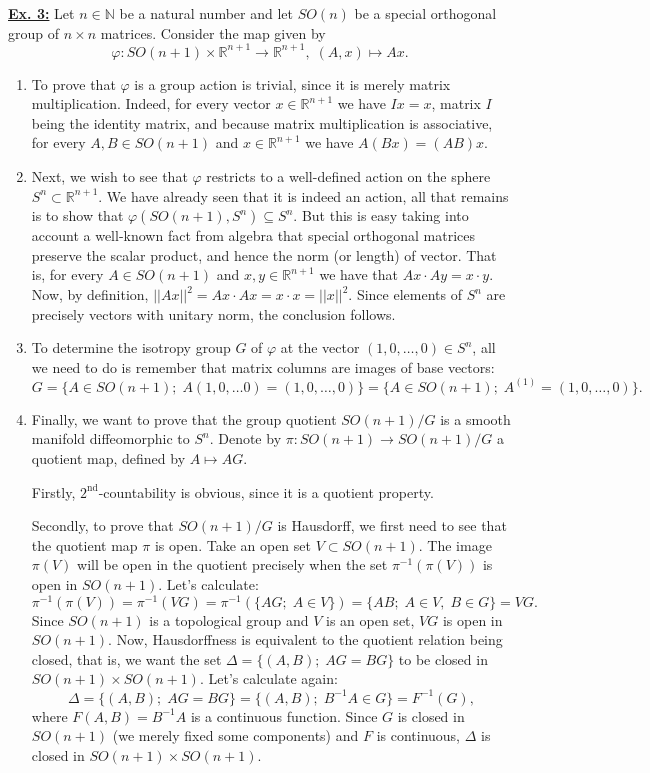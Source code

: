 \documentclass[a4paper, 12pt]{article} %
\newcommand{\N}{\mathbb{N}}
\newcommand{\R}{\mathbb{R}}
\begin{document}
\underline{\textbf{Ex. 3:}}
Let $n \in \N$ be a natural number and let $SO(n)$ be a special orthogonal group of $n \times n$ matrices. Consider the map given by
\[
\varphi\colon SO(n+1) \times \R^{n+1} \to \R^{n+1}, \; (A, x) \mapsto Ax.
\]
\begin{enumerate}[label=(\alph*)]
\item
To prove that $\varphi$ is a group action is trivial, since it is merely matrix multiplication.
Indeed, for every vector $x \in \R^{n+1}$ we have $I x = x$, matrix $I$ being the identity matrix, and because matrix multiplication is associative, for every $A, B \in SO(n+1)$ and $x \in \R^{n+1}$ we have $A(Bx) = (AB)x$.
\item
Next, we wish to see that $\varphi$ restricts to a well-defined action on the sphere $S^n \subset \R^{n+1}$. We have already seen that it is indeed an action, all that remains is to show that $\varphi(SO(n+1), S^n) \subseteq S^n$. But this is easy taking into account a well-known fact from algebra that special orthogonal matrices preserve the scalar product, and hence the norm (or length) of vector. That is, for every $A \in SO(n+1)$ and $x, y \in \R^{n+1}$ we have that $Ax \cdot Ay = x \cdot y$. Now, by definition, $||Ax||^2 = Ax \cdot Ax = x \cdot x = ||x||^2$. Since elements of $S^n$ are precisely vectors with unitary norm, the conclusion follows.
\item
To determine the isotropy group $G$ of $\varphi$ at the vector $(1, 0, \dots, 0) \in S^n$, all we need to do is remember that matrix columns are images of base vectors:
\[
G = \lbrace A \in SO(n+1) ; \; A(1, 0, \dots 0) = (1, 0, \dots, 0) \rbrace = \lbrace A \in SO(n+1) ; \; A^{(1)} = (1, 0, \dots, 0) \rbrace.
\]
\item
Finally, we want to prove that the group quotient $SO(n+1)/G$ is a smooth manifold diffeomorphic to $S^n$. Denote by $\pi \colon SO(n+1) \to SO(n+1)/G$ a quotient map, defined by $A \mapsto AG$.

Firstly, $2^{\text{nd}}$-countability is obvious, since it is a quotient property.

Secondly, to prove that $SO(n+1)/G$ is Hausdorff, we first need to see that the quotient map $\pi$ is open. Take an open set $V \subset SO(n+1)$. The image $\pi(V)$ will be open in the quotient precisely when the set $\pi^{-1}(\pi(V))$ is open in $SO(n+1)$. Let's calculate:
\[
\pi^{-1}(\pi(V)) = \pi^{-1}(VG) = \pi^{-1}(\lbrace AG ; \; A \in V \rbrace) = \lbrace AB ; \; A \in V, \; B \in G \rbrace = VG.
\]
Since $SO(n+1)$ is a topological group and $V$ is an open set, $VG$ is open in $SO(n+1)$.
Now, Hausdorffness is equivalent to the quotient relation being closed, that is, we want the set $\Delta = \lbrace (A, B) ; \; AG = BG \rbrace$ to be closed in $SO(n+1) \times SO(n+1)$. Let's calculate again:
\[
\Delta = \lbrace (A, B) ; \; AG = BG \rbrace = \lbrace (A, B) ; \; B^{-1}A \in G \rbrace = F^{-1}(G),
\]
where $F(A, B) = B^{-1}A$ is a continuous function. Since $G$ is closed in $SO(n+1)$ (we merely fixed some components) and $F$ is continuous, $\Delta$ is closed in $SO(n+1) \times SO(n+1)$.


\end{enumerate}
\end{document}
